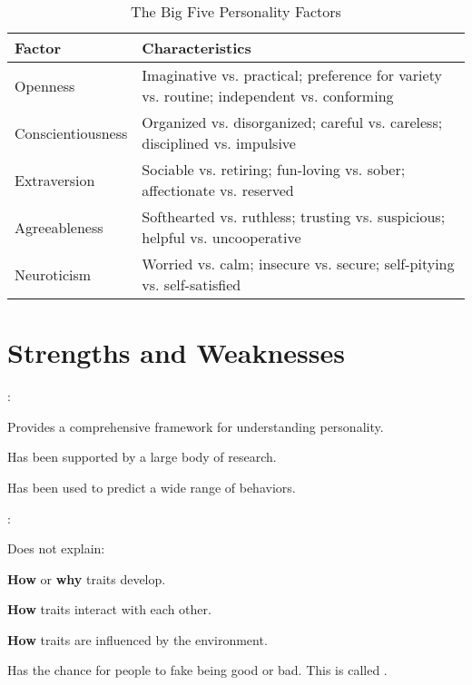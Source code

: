 \begin{table}[htbp]
    \centering
    \begin{tabular}{p{3cm}p{10cm}}
        \toprule
        \textbf{Factor} & \textbf{Characteristics} \\ \midrule
        Openness & Imaginative vs. practical; preference for variety vs. routine; independent vs. conforming \\ \midrule
        Conscientiousness & Organized vs. disorganized; careful vs. careless; disciplined vs. impulsive \\ \midrule
        Extraversion & Sociable vs. retiring; fun-loving vs. sober; affectionate vs. reserved \\ \midrule
        Agreeableness & Softhearted vs. ruthless; trusting vs. suspicious; helpful vs. uncooperative \\ \midrule
        Neuroticism & Worried vs. calm; insecure vs. secure; self-pitying vs. self-satisfied \\
        \bottomrule
    \end{tabular}
    \caption{The Big Five Personality Factors}\label{tab:bigfive}
\end{table}


\section{Strengths and Weaknesses}

\begin{coloredlist}
    \item {}:
    \begin{coloredlist}
        \item Provides a comprehensive framework for understanding personality.
        \item Has been supported by a large body of research.
        \item Has been used to predict a wide range of behaviors.
    \end{coloredlist}
    \item {}:
    \begin{coloredlist}
        \item Does not explain:
        \begin{coloredlist}
            \item \textbf{How} or \textbf{why} traits develop.
            \item \textbf{How} traits interact with each other.
            \item \textbf{How} traits are influenced by the environment.
        \end{coloredlist}
        \item Has the chance for people to fake being good or bad. This is called .
    \end{coloredlist}
\end{coloredlist}

